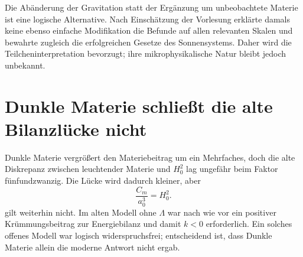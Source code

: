 \begin{classroomqa}
\end{classroomqa}

\begin{classroomqa}
\end{classroomqa}

Die Abänderung der Gravitation statt der Ergänzung um unbeobachtete Materie ist eine logische Alternative. Nach Einschätzung der Vorlesung erklärte damals keine ebenso einfache Modifikation die Befunde auf allen relevanten Skalen und bewahrte zugleich die erfolgreichen Gesetze des Sonnensystems. Daher wird die Teilcheninterpretation bevorzugt; ihre mikrophysikalische Natur bleibt jedoch unbekannt.

\section{Dunkle Materie schließt die alte Bilanzlücke nicht}

Dunkle Materie vergrößert den Materiebeitrag um ein Mehrfaches, doch die alte Diskrepanz zwischen leuchtender Materie und \(H_0^2\) lag ungefähr beim Faktor fünfundzwanzig. Die Lücke wird dadurch kleiner, aber \begin{equation}
\frac{C_m}{a_0^3}=H_0^2.
\end{equation} gilt weiterhin nicht. Im alten Modell ohne \(\Lambda\) war nach wie vor ein positiver Krümmungsbeitrag zur Energiebilanz und damit \(k<0\) erforderlich. Ein solches offenes Modell war logisch widerspruchsfrei; entscheidend ist, dass Dunkle Materie allein die moderne Antwort nicht ergab.


